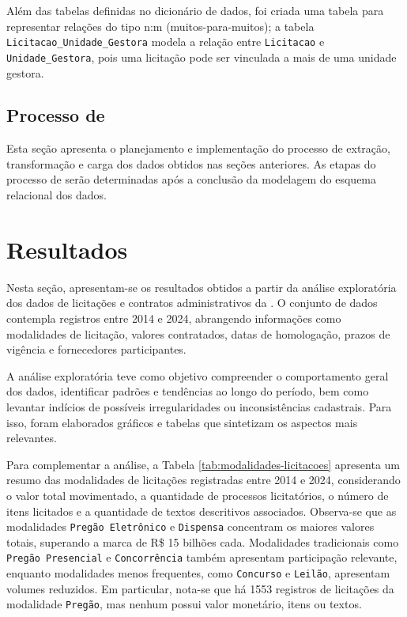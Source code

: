 \documentclass[
	12pt,				%
	oneside,			%
	a4paper,			%
	chapter=TITLE,		%
	section=TITLE,		%
	english,			%
	brazil				%
	]{abntex2}
\begin{document}
Além das tabelas definidas no dicionário de dados, foi criada uma tabela para representar relações do tipo n:m (muitos-para-muitos); a tabela \texttt{Licitacao\_Unidade\_Gestora} modela a relação entre \texttt{Licitacao} e \texttt{Unidade\_Gestora}, pois uma licitação pode ser vinculada a mais de uma unidade gestora.


\section{Processo de }

Esta seção apresenta o planejamento e implementação do processo de extração, transformação e carga dos dados obtidos nas seções anteriores. As etapas do processo de  serão determinadas após a conclusão da modelagem do esquema relacional dos dados.

\chapter{Resultados}
\label{cap:Resultados}

Nesta seção, apresentam-se os resultados obtidos a partir da análise exploratória dos dados de licitações e contratos administrativos da . O conjunto de dados contempla registros entre 2014 e 2024, abrangendo informações como modalidades de licitação, valores contratados, datas de homologação, prazos de vigência e fornecedores participantes.

A análise exploratória teve como objetivo compreender o comportamento geral dos dados, identificar padrões e tendências ao longo do período, bem como levantar indícios de possíveis irregularidades ou inconsistências cadastrais. Para isso, foram elaborados gráficos e tabelas que sintetizam os aspectos mais relevantes.

Para complementar a análise, a Tabela \ref{tab:modalidades-licitacoes} apresenta um resumo das modalidades de licitações registradas entre 2014 e 2024, considerando o valor total movimentado, a quantidade de processos licitatórios, o número de itens licitados e a quantidade de textos descritivos associados. Observa-se que as modalidades \texttt{Pregão Eletrônico} e \texttt{Dispensa} concentram os maiores valores totais, superando a marca de R\$ 15 bilhões cada. Modalidades tradicionais como \texttt{Pregão Presencial} e \texttt{Concorrência} também apresentam participação relevante, enquanto modalidades menos frequentes, como \texttt{Concurso} e \texttt{Leilão}, apresentam volumes reduzidos. Em particular, nota-se que há 1553 registros de licitações da modalidade \texttt{Pregão}, mas nenhum possui valor monetário, itens ou textos. 
\end{document}
